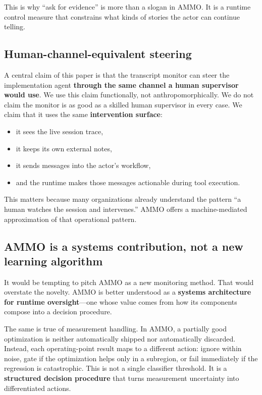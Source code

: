\documentclass[11pt]{article}
\begin{document}
This is why ``ask for evidence'' is more than a slogan in AMMO. It is a runtime control measure that constrains what kinds of stories the actor can continue telling.

\subsection{Human-channel-equivalent steering}

A central claim of this paper is that the transcript monitor can steer the implementation agent \textbf{through the same channel a human supervisor would use}. We use this claim functionally, not anthropomorphically. We do not claim the monitor is as good as a skilled human supervisor in every case. We claim that it uses the same \textbf{intervention surface}:

\begin{itemize}[leftmargin=*,itemsep=2pt]
  \item it sees the live session trace,
  \item it keeps its own external notes,
  \item it sends messages into the actor's workflow,
  \item and the runtime makes those messages actionable during tool execution.
\end{itemize}

This matters because many organizations already understand the pattern ``a human watches the session and intervenes.'' AMMO offers a machine-mediated approximation of that operational pattern.

\subsection{AMMO is a systems contribution, not a new learning algorithm}

It would be tempting to pitch AMMO as a new monitoring method. That would overstate the novelty. AMMO is better understood as a \textbf{systems architecture for runtime oversight}---one whose value comes from how its components compose into a decision procedure.

The same is true of measurement handling. In AMMO, a partially good optimization is neither automatically shipped nor automatically discarded. Instead, each operating-point result maps to a different action: ignore within noise, gate if the optimization helps only in a subregion, or fail immediately if the regression is catastrophic. This is not a single classifier threshold. It is a \textbf{structured decision procedure} that turns measurement uncertainty into differentiated actions.
\end{document}
